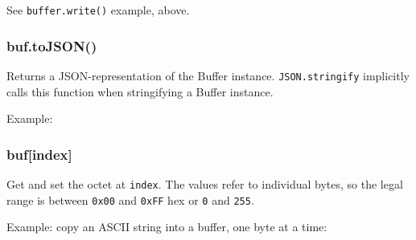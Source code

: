 See \texttt{buffer.write()} example, above.

\subsubsection{buf.toJSON()}\label{buf.tojson}

Returns a JSON-representation of the Buffer instance.
\texttt{JSON.stringify} implicitly calls this function when stringifying
a Buffer instance.

Example:

\begin{Shaded}
\begin{Highlighting}[]
  \NormalTok{(}\NormalTok{);}
 


 
      \NormalTok{=== }
       \NormalTok{(}\NormalTok{)}
  \NormalTok{\});}

\end{Highlighting}
\end{Shaded}

\subsubsection{buf{[}index{]}}\label{bufindex}

Get and set the octet at \texttt{index}. The values refer to individual
bytes, so the legal range is between \texttt{0x00} and \texttt{0xFF} hex
or \texttt{0} and \texttt{255}.

Example: copy an ASCII string into a buffer, one byte at a time:

\begin{Shaded}
\begin{Highlighting}[]
\NormalTok{;}
 \NormalTok{(}\NormalTok{);}

 \NormalTok{(}  
\NormalTok{\}}


\end{Highlighting}
\end{Shaded}

